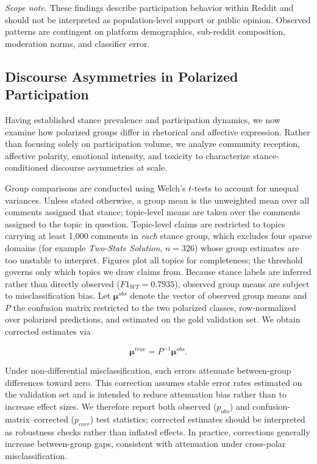 \documentclass[letterpaper]{article} %
\begin{document}
\noindent\emph{Scope note.} These findings describe participation behavior within Reddit and should not be interpreted as population-level support or public opinion. Observed patterns are contingent on platform demographics, sub-reddit composition, moderation norms, and classifier error.

\subsection{Discourse Asymmetries in Polarized Participation}

Having established stance prevalence and participation dynamics, we now examine how polarized groups differ in rhetorical and affective expression. Rather than focusing solely on participation volume, we analyze community reception, affective polarity, emotional intensity, and toxicity to characterize stance-conditioned discourse asymmetries at scale.

Group comparisons are conducted using Welch's $t$-tests to account for unequal variances. Unless stated otherwise, a group mean is the unweighted mean over all comments assigned that stance; topic-level means are taken over the comments assigned to the topic in question. Topic-level claims are restricted to topics carrying at least 1{,}000 comments in \emph{each} stance group, which excludes four sparse domains (for example \emph{Two-State Solution}, $n=326$) whose group estimates are too unstable to interpret. Figures plot all topics for completeness; the threshold governs only which topics we draw claims from. Because stance labels are inferred rather than directly observed ($F1_{WT}=0.7935$), observed group means are subject to misclassification bias. Let $\boldsymbol{\mu}^{obs}$ denote the vector of observed group means and $P$ the confusion matrix restricted to the two polarized classes, row-normalized over polarized predictions, and estimated on the gold validation set. We obtain corrected estimates via

\[
\boldsymbol{\mu}^{true} = P^{-1} \boldsymbol{\mu}^{obs}.
\]

Under non-differential misclassification, such errors attenuate between-group differences toward zero. This correction assumes stable error rates estimated on the validation set and is intended to reduce attenuation bias rather than to increase effect sizes. We therefore report both observed ($p_{obs}$) and confusion-matrix–corrected ($p_{corr}$) test statistics; corrected estimates should be interpreted as robustness checks rather than inflated effects. In practice, corrections generally increase between-group gaps, consistent with attenuation under cross-polar misclassification.
\end{document}
